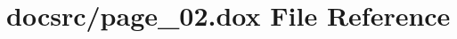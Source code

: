 \hypertarget{page__02_8dox}{\section{docsrc/page\-\_\-02.dox File Reference}
\label{page__02_8dox}
}
